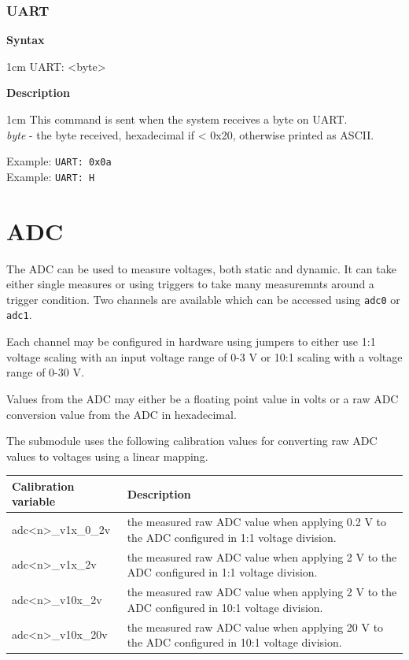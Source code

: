 \documentclass{article}[a4paper]
\begin{document}
\subsubsection{UART}
\begin{tcolorbox}
	{\bf Syntax}

	 1cm \dimexpr\linewidth-2cm\relax
	UART: <byte>

	\medskip
	{\bf Description}

	 1cm \dimexpr\linewidth-2cm\relax
	This command is sent when the system receives a byte on UART.
	\medskip \\
	{\it byte} - the byte received, hexadecimal if < 0x20, otherwise printed as ASCII.

	\medskip
	Example: \texttt{UART: 0x0a} \\
	Example: \texttt{UART: H}
\end{tcolorbox}

\section{ADC}

The ADC can be used to measure voltages, both static and dynamic. It can take
either single measures or using triggers to take many measuremnts around a
trigger condition. Two channels are available
which can be accessed using \texttt{adc0} or \texttt{adc1}.

Each channel may be configured in hardware using jumpers to either use 1:1
voltage scaling with an input voltage range of 0-3 V or 10:1 scaling with a
voltage range of 0-30 V.

Values from the ADC may either be a floating point value in volts or a raw ADC
conversion value from the ADC in hexadecimal.

The submodule uses the following calibration values for converting raw ADC values to
voltages using a linear mapping.

\medskip

\noindent
\begin{tabularx}{\textwidth}{|p{4cm}|X|}
\hline
Calibration variable & Description \\
\hline
adc<n>\_v1x\_0\_2v & the measured raw ADC value when applying 0.2 V to the
ADC configured in 1:1 voltage division. \\
\hline
adc<n>\_v1x\_2v & the measured raw ADC value when applying 2 V to the
ADC configured in 1:1 voltage division. \\
\hline
adc<n>\_v10x\_2v & the measured raw ADC value when applying 2 V to the
ADC configured in 10:1 voltage division. \\
\hline
adc<n>\_v10x\_20v & the measured raw ADC value when applying 20 V to the
ADC configured in 10:1 voltage division. \\
\hline
\end{tabularx}
\end{document}
